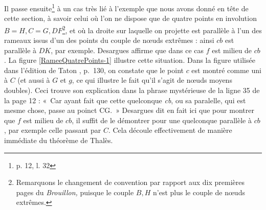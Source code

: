 \documentclass[12pt, a4paper]{article}
\begin{document}
Il passe ensuite\footnote{p. 12, l. 32} à un cas très lié à l'exemple que nous avons donné en tête de cette section, à savoir celui où l'on ne dispose que de quatre points en involution $B=H, C=G, DF$\footnote{Remarquons le changement de convention par rapport aux dix premières pages du \textit{Brouillon,} puisque le couple $B,H$ n'est plus le couple de n{\oe}uds extrêmes.}, et où la droite sur laquelle on projette est parallèle à l'un des rameaux issus d'un des points du couple de n{\oe}uds extrêmes : ainsi $cb$ est parallèle à $DK$, par exemple. Desargues affirme que dans ce cas $f$ est milieu de $cb$. La figure \ref{RameeQuatrePoints-1} illustre cette situation. Dans la figure utilisée dans l'édition de Taton \cite{taton}, p.~130, on constate que le point $c$ est montré comme uni à $C$ (et aussi à $G$ et $g$, ce qui illustre le fait qu'il s'agit de n{\oe}uds moyens doubles).  Ceci trouve son explication dans la phrase mystérieuse de la ligne 35 de la page 12 : «~Car ayant fait que cette quelconque {\it cb}, ou sa paralelle, qui est mesme chose, passe au poinct CG.~» Desargues dit en fait ici que pour montrer que $f$ est milieu de $cb$, il suffit de le démontrer pour une quelconque parallèle à $cb$, par exemple celle passant par $C$. Cela découle effectivement de manière immédiate du théorème de Thalès.
\end{document}
